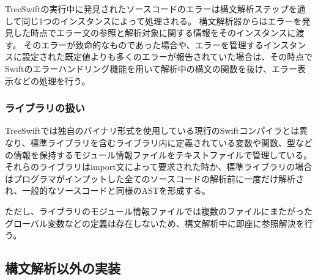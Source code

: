TreeSwiftの実行中に発見されたソースコードのエラーは構文解析ステップを通して同じ1つのインスタンスによって処理される。
構文解析器からはエラーを発見した時点でエラー文の参照と解析対象に関する情報をそのインスタンスに渡す。
そのエラーが致命的なものであった場合や、エラーを管理するインスタンスに設定された既定値よりも多くのエラーが報告されていた場合は、その時点でSwiftのエラーハンドリング機能を用いて解析中の構文の関数を抜け、エラー表示などの処理を行う。


\subsubsection{ライブラリの扱い}

TreeSwiftでは独自のバイナリ形式を使用している現行のSwiftコンパイラとは異なり、標準ライブラリを含むライブラリ内に定義されている変数や関数、型などの情報を保持するモジュール情報ファイルをテキストファイルで管理している。
それらのライブラリはimport文によって要求された時か、標準ライブラリの場合はプログラマがインプットした全てのソースコードの解析前に一度だけ解析され、一般的なソースコードと同様のASTを形成する。

ただし、ライブラリのモジュール情報ファイルでは複数のファイルにまたがったグローバル変数などの定義は存在しないため、構文解析中に即座に参照解決を行う。

\subsection{構文解析以外の実装}

